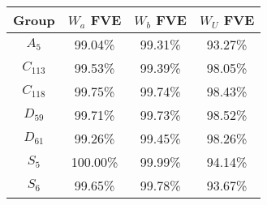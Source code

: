 \begin{tabular}{cccc}
\toprule
    Group & $W_a$ FVE & $W_b$ FVE & $W_U$ FVE \\
\midrule
  $A_{5}$ &   99.04\% &   99.31\% &   93.27\% \\
$C_{113}$ &   99.53\% &   99.39\% &   98.05\% \\
$C_{118}$ &   99.75\% &   99.74\% &   98.43\% \\
 $D_{59}$ &   99.71\% &   99.73\% &   98.52\% \\
 $D_{61}$ &   99.26\% &   99.45\% &   98.26\% \\
  $S_{5}$ &  100.00\% &   99.99\% &   94.14\% \\
  $S_{6}$ &   99.65\% &   99.78\% &   93.67\% \\
\bottomrule
\end{tabular}
